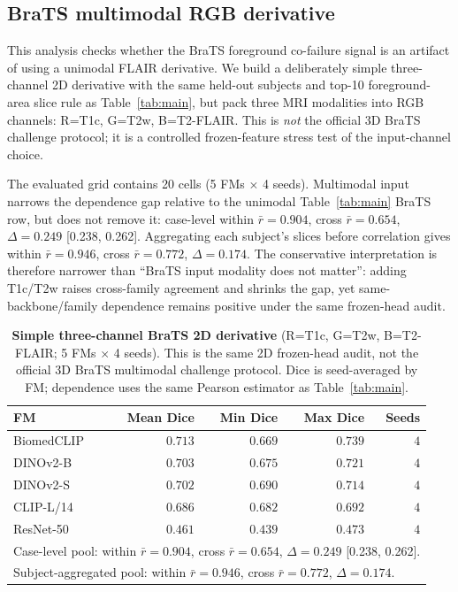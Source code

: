\subsection{BraTS multimodal RGB derivative}
\label{app:m20}

This analysis checks whether the BraTS foreground co-failure signal is an artifact of using a unimodal FLAIR derivative. We build a deliberately simple three-channel 2D derivative with the same held-out subjects and top-10 foreground-area slice rule as Table~\ref{tab:main}, but pack three MRI modalities into RGB channels: R=T1c, G=T2w, B=T2-FLAIR. This is \emph{not} the official 3D BraTS challenge protocol; it is a controlled frozen-feature stress test of the input-channel choice.

The evaluated grid contains 20 cells (5 FMs $\times$ 4 seeds). Multimodal input narrows the dependence gap relative to the unimodal Table~\ref{tab:main} BraTS row, but does not remove it: case-level within $\bar r{=}0.904$, cross $\bar r{=}0.654$, $\Delta{=}0.249$ [0.238, 0.262]. Aggregating each subject's slices before correlation gives within $\bar r{=}0.946$, cross $\bar r{=}0.772$, $\Delta{=}0.174$. The conservative interpretation is therefore narrower than ``BraTS input modality does not matter'': adding T1c/T2w raises cross-family agreement and shrinks the gap, yet same-backbone/family dependence remains positive under the same frozen-head audit.

\begin{table}[!htbp]
  \caption{\textbf{Simple three-channel BraTS 2D derivative} (R=T1c, G=T2w, B=T2-FLAIR; 5 FMs $\times$ 4 seeds). This is the same 2D frozen-head audit, not the official 3D BraTS multimodal challenge protocol. Dice is seed-averaged by FM; dependence uses the same Pearson estimator as Table~\ref{tab:main}.}
  \label{tab:m20}
  \centering\small
  \begin{tabular}{lrrrr}
    \toprule
    FM & Mean Dice & Min Dice & Max Dice & Seeds \\
    \midrule
    BiomedCLIP & $0.713$ & $0.669$ & $0.739$ & $4$ \\
    DINOv2-B   & $0.703$ & $0.675$ & $0.721$ & $4$ \\
    DINOv2-S   & $0.702$ & $0.690$ & $0.714$ & $4$ \\
    CLIP-L/14  & $0.686$ & $0.682$ & $0.692$ & $4$ \\
    ResNet-50  & $0.461$ & $0.439$ & $0.473$ & $4$ \\
    \midrule
    \multicolumn{5}{l}{Case-level pool: within $\bar r{=}0.904$, cross $\bar r{=}0.654$, $\Delta{=}0.249$ [0.238, 0.262].} \\
    \multicolumn{5}{l}{Subject-aggregated pool: within $\bar r{=}0.946$, cross $\bar r{=}0.772$, $\Delta{=}0.174$.} \\
    \bottomrule
  \end{tabular}
\end{table}

